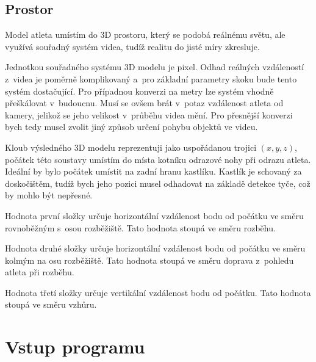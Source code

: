 



\subsection{Prostor}

Model atleta umístím do 3D prostoru, který se podobá reálnému světu, ale využívá souřadný systém videa, tudíž realitu do jisté míry zkresluje.

Jednotkou souřadného systému 3D modelu je pixel. Odhad reálných vzdáleností z~videa je poměrně komplikovaný a~pro základní parametry skoku bude tento systém dostačující. Pro případnou konverzi na metry lze systém vhodně přeškálovat v~budoucnu. Musí se ovšem brát v~potaz vzdálenost atleta od kamery, jelikož se jeho velikost v~průběhu videa mění. Pro přesnější konverzi bych tedy musel zvolit jiný způsob určení pohybu objektů ve videu.

Kloub výsledného 3D modelu reprezentuji jako uspořádanou trojici $(x,y,z)$, počátek této soustavy umístím do místa kotníku odrazové nohy při odrazu atleta. Ideální by bylo počátek umístit na zadní hranu kastlíku. Kastlík je schovaný za doskočištěm, tudíž bych jeho pozici musel odhadovat na základě detekce tyče, což by mohlo být nepřesné.

Hodnota první složky určuje horizontální vzdálenost bodu od počátku ve směru rovnoběžným s~osou rozběžiště. Tato hodnota stoupá ve směru rozběhu.

Hodnota druhé složky určuje horizontální vzdálenost bodu od počátku ve směru kolmým na osu rozběžiště. Tato hodnota stoupá ve směru doprava z~pohledu atleta při rozběhu.

Hodnota třetí složky určuje vertikální vzdálenost bodu od počátku. Tato hodnota stoupá ve směru vzhůru.





\section{Vstup programu}
\label{sec:vstup}

